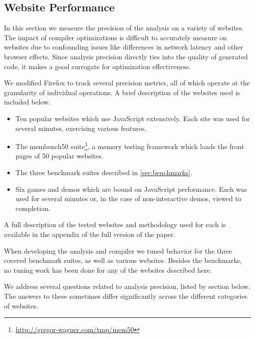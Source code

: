 \subsection{Website Performance}
\label{sec:websites}

In this section we measure the precision of the analysis
on a variety of websites.
The impact of compiler optimizations is difficult to accurately
measure on websites due to confounding issues like differences
in network latency and other browser effects.
Since analysis precision directly ties into the quality of
generated code, it makes a good surrogate for optimization effectiveness.

We modified Firefox to track several precision metrics,
all of which operate at the granularity of individual operations.
A brief description of the websites used is included below.

\begin{itemize}

\item Ten popular websites which use JavaScript extensively.
Each site was used for several minutes, exercising various features.

\item The membench50 suite\footnote{\url{http://gregor-wagner.com/tmp/mem50}},
a memory testing framework
which loads the front pages of 50 popular websites.

\item The three benchmark suites described in \Section\ref{sec:benchmarks}.

\item Six games and demos which are bound on JavaScript performance.
Each was used for several minutes or, in the case of non-interactive
demos, viewed to completion.

\end{itemize}

A full description of the tested websites and methodology used for each
is available in the appendix of the full version of the paper.

When developing the analysis and compiler we tuned behavior for the three
covered benchmark suites, as well as various websites.
Besides the benchmarks, no tuning work has been done for any of the
websites described here.

We address several questions related to analysis precision,
listed by section below. The answers to these sometimes differ significantly
across the different categories of websites.


